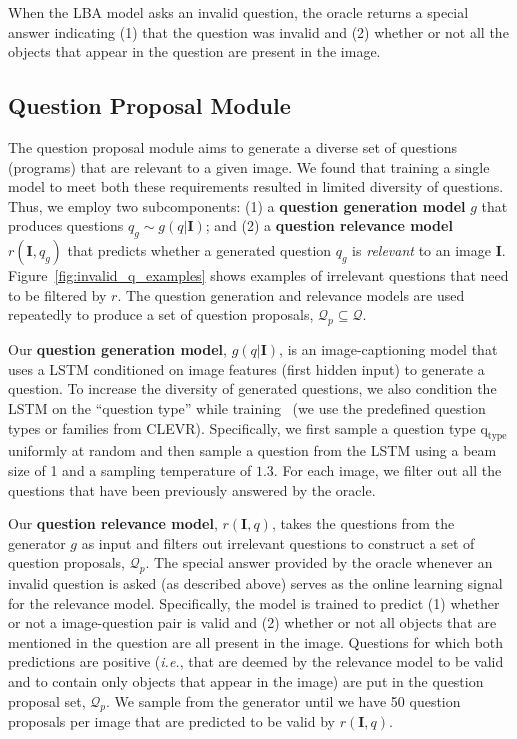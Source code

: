 \documentclass[10pt,twocolumn,letterpaper]{article}
\newcommand{\image}{\mathbf{I}}
\newcommand{\imageQpair}{(\mathbf{I}, q)}
\newcommand{\qtype}{\mathrm{q_{type}}}
\begin{document}
When the LBA model asks an invalid question, the oracle returns a special answer indicating (1) that the question was invalid and (2) whether or not all the objects that appear in the question are present in the image.


\vspace{-0.05in}
\subsection{Question Proposal Module}
\label{sec:question-proposal}
\vspace{-0.05in}

The question proposal module aims to generate a diverse set of questions (programs) that are relevant to a given image. We found that training a single model to meet both these requirements resulted in limited diversity of questions. Thus, we employ two subcomponents: (1) a \textbf{question generation model} $g$ that produces questions $q_{g} \sim g(q | \image)$; and (2) a \textbf{question relevance model} $r(\image, q_{g})$ that predicts whether a generated question $q_{g}$ is \emph{relevant} to an image $\image$. Figure~\ref{fig:invalid_q_examples} shows examples of irrelevant questions that need to be filtered by $r$. The question generation and relevance models are used repeatedly to produce a set of question proposals, $\mathcal{Q}_p \subseteq \mathcal{Q}$.  


Our \textbf{question generation model}, $g(q | \image)$, is an image-captioning model that uses a LSTM conditioned on image features (first hidden input) to generate a question. To increase the diversity of generated questions, we also condition the LSTM on the ``question type'' while training~\cite{ferraro16visual} (we use the predefined question types or families from CLEVR). Specifically, we first sample a question type $\qtype$ uniformly at random and then sample a question from the LSTM using a beam size of 1 and a sampling temperature of $1.3$. For each image, we filter out all the questions that have been previously answered by the oracle.


Our \textbf{question relevance model}, $r\imageQpair$, takes the questions from the generator $g$ as input and filters out irrelevant questions to construct a set of question proposals, $\mathcal{Q}_p$. The special answer provided by the oracle whenever an invalid question is asked (as described above) serves as the online learning signal for the relevance model. Specifically, the model is trained to predict (1) whether or not a image-question pair is valid and (2) whether or not all objects that are mentioned in the question are all present in the image. Questions for which both predictions are positive (\emph{i.e.}, that are deemed by the relevance model to be valid and to contain only objects that appear in the image) are put in the question proposal set, $\mathcal{Q}_p$. We sample from the generator until we have 50 question proposals per image that are predicted to be valid by $r\imageQpair$.
\end{document}
